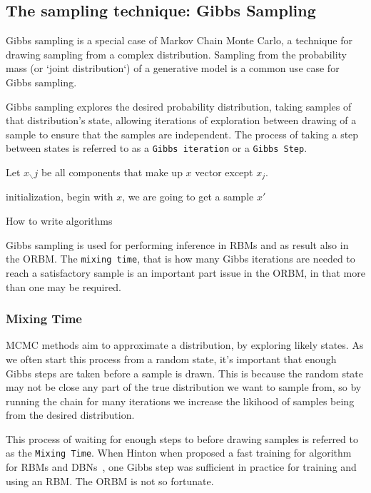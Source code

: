 \subsection{The sampling technique: Gibbs Sampling}

Gibbs sampling is a special case of Markov Chain Monte Carlo, a technique for drawing sampling from a complex distribution. Sampling from the probability mass (or `joint distribution`) of a generative model is a common use case for Gibbs sampling.

Gibbs sampling explores the desired probability distribution, taking samples of that distribution's state, allowing iterations of exploration between drawing of a sample to ensure that the samples are independent. The process of taking a step between states is referred to as a \texttt{Gibbs iteration} or a \texttt{Gibbs Step}.

Let $ x_{\smallsetminus} j$ be all components that make up $x$ vector except $x_j$.
\begin{algorithm}[!ht]
 initialization, begin with $x$, we are going to get a sample $x'$\;
 \caption{How to write algorithms}\label{Alg:Gibbs-Sampling}
\end{algorithm}

Gibbs sampling is used for performing inference in RBMs and as result also in the ORBM. The \texttt{mixing time}, that is how many Gibbs iterations are needed to reach a satisfactory sample is an important part issue in the ORBM, in that more than one may be required.

\subsubsection{Mixing Time}

MCMC methods aim to approximate a distribution, by exploring likely states. As we often start this process from a random state, it's important that enough Gibbs steps are taken before a sample is drawn. This is because the random state may not be close any part of the true distribution we want to sample from, so by running the chain for many iterations we increase the likihood of samples being from the desired distribution.

This process of waiting for enough steps to before drawing samples is referred to as the \texttt{Mixing Time}. When Hinton when proposed a fast training for algorithm for RBMs and DBNs~\cite{Hinton:2006:FLA:1161603.1161605}, one Gibbs step was sufficient in practice for training and using an RBM. The ORBM is not so fortunate.



